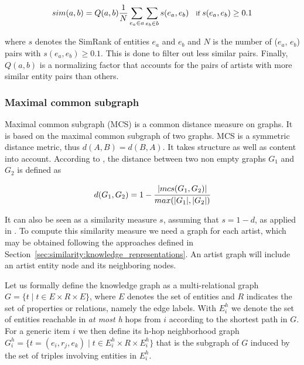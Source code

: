 \begin{equation}
\footnotesize
sim(a,b) = Q(a,b) \frac{1}{N} \sum_{e_a \in a} \sum_{e_b \in b} s(e_a, e_b)\quad \text{if}\ s(e_a, e_b) \geq 0.1
\end{equation}

where $s$ denotes the SimRank of entities $e_a$ and $e_b$ and $N$ is the number of ($e_a$, $e_b$) pairs with $s(e_a, e_b) \geq 0.1$. This is done to filter out less similar pairs.
%
Finally, $Q(a,b)$ is a normalizing factor that accounts for the pairs of artists with more similar entity pairs than others.

%


\subsubsection{Maximal common subgraph}\label{sec:similarity:method:sim:mcs} %

Maximal common subgraph (MCS) is a common distance measure on graphs. It is based on the maximal common subgraph of two graphs. MCS is a symmetric distance metric, thus $d(A,B)=d(B,A)$. It takes structure as well as content into account. According to \cite{Bunke1998}, the distance between two non empty graphs $G_{1}$ and $G_{2}$ is defined as

\begin{equation}
d(G_{1},G_{2}) = 1 - \cfrac{| mcs(G_{1},G_{2}) |}{max(|G_{1}|,|G_{2}|)}
\end{equation}

It can also be seen as a similarity measure $s$, assuming that $s=1-d$, as applied in \cite{Lux2005}. To compute this similarity measure we need a graph for each artist, which may be obtained following the approaches defined in Section~\ref{sec:similarity:knowledge_representations}. An artist graph will include an artist entity node and its neighboring nodes.

Let us formally define the knowledge graph as a multi-relational graph $G=\lbrace t \mid t \in E \times R \times E \rbrace$, where $E$ denotes the set of entities and $R$ indicates the set of properties or relations, namely the edge labels. %
With $E^h_i$ we denote the set of entities reachable in \textit{at most h} hops from $i$ according to the shortest path in $G$. For a generic item $i$ we then define its h-hop neighborhood graph $G^h_i=\lbrace t=(e_i,r_j,e_k) \mid t \in E^h_i \times R \times E^h_i \rbrace$ that is the subgraph of $G$ induced by the set of triples involving entities in $E^h_i$. 

